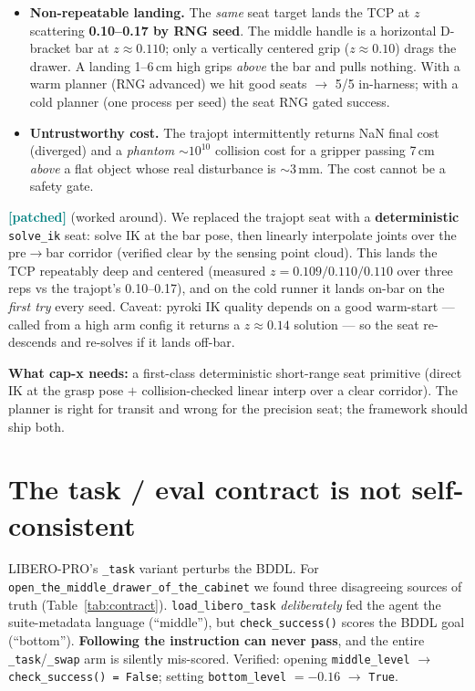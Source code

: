 \documentclass[11pt]{article}
\newcommand{\patched}{\textcolor{teal}{\textbf{[patched]}}}
\newcommand{\code}[1]{\texttt{#1}}
\begin{document}
\begin{itemize}
  \item \textbf{Non-repeatable landing.} The \emph{same} seat target lands the TCP at
        $z$ scattering \textbf{0.10--0.17 by RNG seed}. The middle handle is a horizontal
        D-bracket bar at $z\!\approx\!0.110$; only a vertically centered grip
        ($z\!\approx\!0.10$) drags the drawer. A landing 1--6\,cm high grips \emph{above}
        the bar and pulls nothing. With a warm planner (RNG advanced) we hit good seats
        $\to$ 5/5 in-harness; with a cold planner (one process per seed) the seat RNG gated
        success.
  \item \textbf{Untrustworthy cost.} The trajopt intermittently returns NaN final cost
        (diverged) and a \emph{phantom} $\sim$$10^{10}$ collision cost for a gripper passing
        7\,cm \emph{above} a flat object whose real disturbance is $\sim$3\,mm. The cost
        cannot be a safety gate.
\end{itemize}

\noindent\patched{} (worked around). We replaced the trajopt seat with a
\textbf{deterministic} \code{solve\_ik} seat: solve IK at the bar pose, then linearly
interpolate joints over the pre$\to$bar corridor (verified clear by the sensing point cloud).
This lands the TCP repeatably deep and centered (measured $z = 0.109/0.110/0.110$ over three
reps vs the trajopt's 0.10--0.17), and on the cold runner it lands on-bar on the \emph{first
try} every seed. Caveat: pyroki IK quality depends on a good warm-start --- called from a
high arm config it returns a $z\!\approx\!0.14$ solution --- so the seat re-descends and
re-solves if it lands off-bar.

\medskip\noindent\textbf{What cap-x needs:} a first-class deterministic short-range seat
primitive (direct IK at the grasp pose $+$ collision-checked linear interp over a clear
corridor). The planner is right for transit and wrong for the precision seat; the framework
should ship both.

\section{The task / eval contract is not self-consistent}
\label{sec:contract}
LIBERO-PRO's \code{\_task} variant perturbs the BDDL. For
\code{open\_the\_middle\_drawer\_of\_the\_cabinet} we found three disagreeing sources of
truth (Table~\ref{tab:contract}). \code{load\_libero\_task} \emph{deliberately} fed the
agent the suite-metadata language (``middle''), but \code{check\_success()} scores the BDDL
goal (``bottom''). \textbf{Following the instruction can never pass}, and the entire
\code{\_task}/\code{\_swap} arm is silently mis-scored. Verified: opening
\code{middle\_level} $\to$ \code{check\_success() = False}; setting
\code{bottom\_level} $= -0.16$ $\to$ \code{True}.
\end{document}
